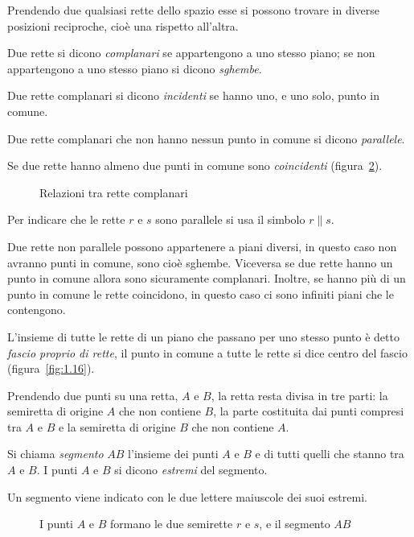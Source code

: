 Prendendo due qualsiasi rette dello spazio esse si possono trovare in diverse posizioni reciproche, cioè una rispetto all'altra.
\begin{definizione}
Due rette si dicono \emph{complanari} se appartengono a uno stesso piano; se non appartengono a uno stesso piano si dicono \emph{sghembe}.

Due rette complanari si dicono \emph{incidenti} se hanno uno, e uno solo, punto in comune.

Due rette complanari che non hanno nessun punto in comune si dicono \emph{parallele}.

Se due rette hanno almeno due punti in comune sono \emph{coincidenti} (figura~\ref{fig:1.12}).
\end{definizione}
\begin{figure}[b,t,h]
 \centering 
 \caption{Relazioni tra rette complanari}\label{fig:1.12}
\end{figure}
Per indicare che le rette $r$ e $s$ sono parallele si usa il simbolo $r \parallel s$.

\osservazione Due rette non parallele possono appartenere a piani diversi, in questo caso non avranno punti in comune, sono cioè sghembe. Viceversa se due rette hanno un punto in comune allora sono sicuramente complanari. Inoltre, se hanno più di un punto in comune le rette coincidono, in questo caso ci sono infiniti piani che le contengono. 

\begin{definizione}
L'insieme di tutte le rette di un piano che passano per uno stesso punto è detto \emph{fascio proprio di rette}, il punto in comune a tutte le rette si dice centro del fascio (figura~\ref{fig:1.16}).
\end{definizione}

Prendendo due punti su una retta, $A$ e $B$, la retta resta divisa in tre parti: la semiretta di origine $A$ che non contiene $B$, la parte costituita dai punti compresi tra $A$ e $B$ e la semiretta di origine $B$ che non contiene $A$.

\begin{definizione}
Si chiama \emph{segmento} $AB$ l'insieme dei punti $A$ e $B$ e di tutti quelli che stanno tra $A$ e $B$.
I punti $A$ e $B$ si dicono \emph{estremi} del segmento.
\end{definizione}
Un segmento viene indicato con le due lettere maiuscole dei suoi estremi.
\begin{figure}[bth]
 \centering 
 \caption{I punti $A$ e $B$ formano le due semirette $r$ e $s$, e il segmento $AB$}\label{fig:1.12}
\end{figure}

